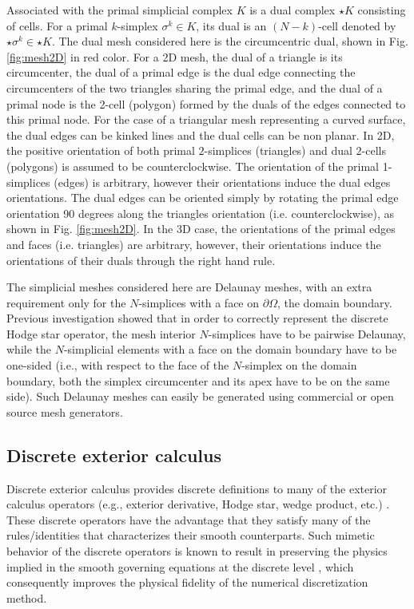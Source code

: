 \documentclass[final,12pt,times]{elsarticle}
\begin{document}
Associated with the primal simplicial complex $K$ is a dual complex $\star K$ consisting of cells. For a primal $k$-simplex $\sigma^k \in K$, its dual is an $(N-k)$-cell denoted by $\star \sigma^k \in  \star K$. The dual mesh considered here is the circumcentric dual, shown in Fig. \ref{fig:mesh2D} in red color. For a 2D mesh, the dual of a triangle is its circumcenter, the dual of a primal edge is the dual edge connecting the circumcenters of the two triangles sharing the primal edge, and the dual of a primal node is the 2-cell (polygon) formed by the duals of the edges connected to this primal node. For the case of a triangular mesh representing a curved surface, the dual edges can be kinked lines and the dual cells can be non planar. In 2D, the positive orientation of both primal $2$-simplices (triangles) and dual $2$-cells (polygons) is assumed to be counterclockwise. The orientation of the primal 1-simplices (edges) is arbitrary, however their orientations induce the dual edges orientations. The dual edges can be oriented simply by rotating the primal edge orientation 90 degrees along the triangles orientation (i.e. counterclockwise), as shown in Fig. \ref{fig:mesh2D}. In the 3D case, the orientations of the primal edges and faces (i.e. triangles) are arbitrary, however, their orientations induce the orientations of their duals through the right hand rule.   

The simplicial meshes considered here are Delaunay meshes, with an extra requirement only for the $N$-simplices with a face on $\partial \Omega$, the domain boundary. Previous investigation \cite{hirani2013delaunay} showed that in order to correctly represent the discrete Hodge star operator, the mesh interior $N$-simplices have to be pairwise Delaunay, while the $N$-simplicial elements with a face on the domain boundary have to be one-sided (i.e., with respect to the face of the $N$-simplex on the domain boundary, both the simplex circumcenter and its apex have to be on the same side). Such Delaunay meshes can easily be generated using commercial or open source mesh generators. 

\subsection{Discrete exterior calculus}
\label{subsec:DEC}

Discrete exterior calculus provides discrete definitions to many of the exterior calculus operators (e.g., exterior derivative, Hodge star, wedge product, etc.) \cite{hirani2003discrete,desbrun2005discrete}. These discrete operators have the advantage that they satisfy many of the rules/identities that characterizes their smooth counterparts. Such mimetic behavior of the discrete operators is known to result in preserving the physics implied in the smooth governing equations at the discrete level \cite{perot2007discrete}, which consequently improves the physical fidelity of the numerical discretization method.
\end{document}
